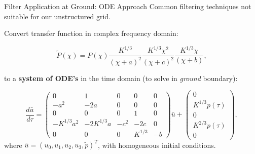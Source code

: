 \documentclass{beamer}
\newcounter{sectionframecount}
\begin{document}
\begin{frame}[t]{Filter Application at Ground: ODE Approach}
\vspace{-10pt}
Common filtering techniques not suitable for our unstructured grid.

\vspace{8pt}
Convert transfer function in complex frequency domain:

\begin{equation}
  \tilde{P}(\chi) =P(\chi)\dfrac{K^{1/3}}{(\chi+a)^2}\dfrac{K^{1/3}\chi^2}{(\chi+c)^2}\dfrac{K^{1/3}\chi}{(\chi+b)},
\end{equation}

to a \textbf{system of ODE's} in the time domain (to solve in \textit{ground} boundary):

\begin{equation}
  \dfrac{d\bar{u}}{d\tau} =
      \begin{pmatrix}
          0 & 1 & 0 & 0 & 0\\
          -a^2 & -2a & 0 & 0 & 0\\
          0 & 0 & 0 & 1 & 0\\
          -K^{1/3}a^2 & -2K^{1/3}a & -c^2 & -2c & 0\\
          0 & 0 & 0 &K^{1/3} & -b
      \end{pmatrix}
      \bar{u}
      +
      \begin{pmatrix}
          0 \\
          K^{1/3}p(\tau)\\
          0\\
          K^{2/3}p(\tau)\\
          0
      \end{pmatrix},
  \end{equation}
where $\bar{u}=(u_0,u_1,u_2,u_3,\tilde{p})^T$, with homogeneous initial conditions.
\end{frame}

\end{document}
